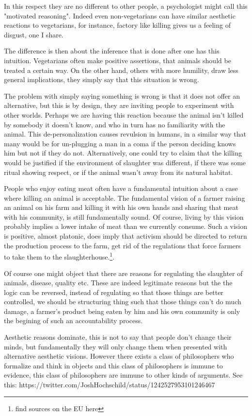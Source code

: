 \documentclass[12pt]{report}
\numberwithin{equation}{section}
\begin{document}
In this respect they are no different to other people, a psychologist might call this "motivated reasoning". Indeed even non-vegetarians can have similar aesthetic reactions to vegetarians, for instance, factory like killing gives us a feeling of disgust, one I share. 

The difference is then about the inference that is done after one has this intuition. Vegetarians often make positive assertions, that animals should be treated a certain way. On the other hand, others with more humility, draw less general implications, they simply say that this situation is wrong. 

The problem with simply saying something is wrong is that it does not offer an alternative, but this is by design, they are inviting people to experiment with other worlds. Perhaps we are having this reaction because the animal isn't killed by somebody it doesn't know, and who in turn has no familiarity with the animal. This de-personalization causes revulsion in humans, in a similar way that many would be for un-plugging a man in a coma if the person deciding knows him but not if they do not. Alternatively, one could try to claim that the killing would be justified if the environment of slaughter was different, if there was some ritual showing respect, or if the animal wasn't away from its natural habitat. 

People who enjoy eating meat often have a fundamental intuition about a case where killing an animal is acceptable. The fundamental vision of a farmer raising an animal on his farm and killing it with his own hands and sharing that meat with his community, is still fundamentally sound. Of course, living by this vision probably implies a lower intake of meat than we currently consume. Such a vision is positive, almost platonic, does imply that activism should be directed to return the production process to the farm, get rid of the regulations that force farmers to take them to the slaughterhouse.\footnote{find sources on the EU here}. 

Of course one might object that there are reasons for regulating the slaughter of animals, disease, quality etc. These are indeed legitimate reasons but the the logic can be reversed, instead of regulating so that those things are better controlled, we should be structuring thing such that those things can't do much damage, a farmer's product being eaten by him and his own community is only the begining of such an accountability process. 

Aesthetic reasons dominate, this is not to say that people don't change their minds, but fundamentally they will only change them when presented with alternative aesthetic visions. However there exists a class of philosophers who formalize and think in objects and this class of philosophers is immune to evidence, this class of philosophers are immune to other kinds of arguments.
See this: https://twitter.com/JoshHochschild/status/1242527953101246467
\end{document}
